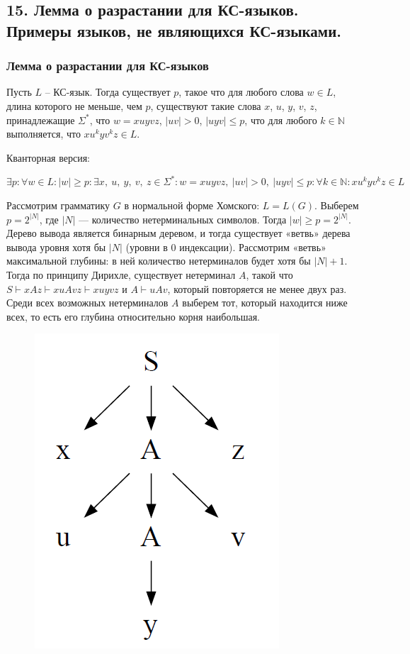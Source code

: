 \subsection{15. Лемма о разрастании для КС-языков. Примеры языков, не являющихся КС-языками.}

\subsubsection*{Лемма о разрастании для КС-языков}

\Lemma Пусть $L$ -- КС-язык. Тогда существует $p$, такое что для любого слова $w \in L$, длина которого не меньше, чем $p$, существуют такие слова $x$, $u$, $y$, $v$, $z$, принадлежащие $\Sigma^*$, что $w = xuyvz$, $|uv| > 0$, $|uyv| \leq p$, что для любого $k \in \mathbb{N}$ выполняется, что $x u^k y v^k z \in L$.

Кванторная версия:
\begin{center}
    $\exists p : \forall w \in L : |w| \geq p : \exists x, \ u, \ y, \ v, \ z \in \Sigma^* : w = xuyvz, \ |uv| > 0, \ |uyv| \leq p : \forall k \in \mathbb{N} : x u^k y v^k z \in L$
\end{center}

\Proof Рассмотрим грамматику $G$ в нормальной форме Хомского: $L = L(G)$. Выберем $p = 2^{|N|}$, где $|N|$ — количество нетерминальных символов. Тогда $|w| \geq p = 2^{|N|}$. Дерево вывода является бинарным деревом, и тогда существует «ветвь» дерева вывода уровня хотя бы $|N|$ (уровни в 0 индексации). Рассмотрим «ветвь» максимальной глубины: в ней количество нетерминалов будет хотя бы $|N| + 1$. Тогда по принципу Дирихле, существует нетерминал $A$, такой что $S \vdash xAz \vdash xuAvz \vdash xuyvz$ и $A \vdash uAv$, который повторяется не менее двух раз. Среди всех возможных нетерминалов $A$ выберем тот, который находится ниже всех, то есть его глубина относительно корня наибольшая.

\begin{figure}[h!]
        \centering
        \includegraphics[scale=0.25]{images/2_14_1.png}
        \label{fig:first}
\end{figure}


